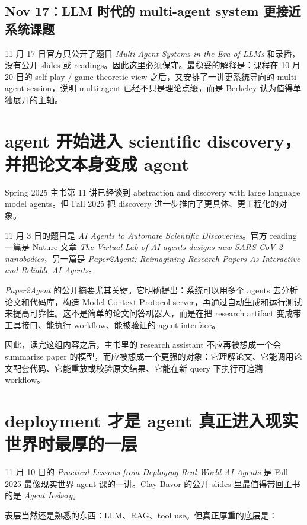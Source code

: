 \subsection{Nov 17：LLM 时代的 multi-agent system 更接近系统课题}

11 月 17 日官方只公开了题目 \emph{Multi-Agent Systems in the Era of LLMs} 和录播，没有公开 slides 或 readings。因此这里必须保守。最稳妥的解释是：课程在 10 月 20 日的 self-play / game-theoretic view 之后，又安排了一讲更系统导向的 multi-agent session，说明 multi-agent 已经不只是理论点缀，而是 Berkeley 认为值得单独展开的主轴。

\section{agent 开始进入 scientific discovery，并把论文本身变成 agent}

Spring 2025 主书第 11 讲已经谈到 abstraction and discovery with large language model agents。但 Fall 2025 把 discovery 进一步推向了更具体、更工程化的对象。

11 月 3 日的题目是 \emph{AI Agents to Automate Scientific Discoveries}。官方 reading 一篇是 Nature 文章 \emph{The Virtual Lab of AI agents designs new SARS-CoV-2 nanobodies}，另一篇是 \emph{Paper2Agent: Reimagining Research Papers As Interactive and Reliable AI Agents}。

\emph{Paper2Agent} 的公开摘要尤其关键。它明确提出：系统可以用多个 agents 去分析论文和代码库，构造 Model Context Protocol server，再通过自动生成和运行测试来提高可靠性。这不是简单的论文问答机器人，而是在把 research artifact 变成带工具接口、能执行 workflow、能被验证的 agent interface。

因此，读完这组内容之后，主书里的 research assistant 不应再被想成一个会 summarize paper 的模型，而应被想成一个更强的对象：它理解论文、它能调用论文配套代码、它能重放或校验原文结果、它能在新 query 下执行可追溯 workflow。

\section{deployment 才是 agent 真正进入现实世界时最厚的一层}

11 月 10 日的 \emph{Practical Lessons from Deploying Real-World AI Agents} 是 Fall 2025 最像现实世界 agent 课的一讲。Clay Bavor 的公开 slides 里最值得带回主书的是 \emph{Agent Iceberg}。

表层当然还是熟悉的东西：LLM、RAG、tool use。但真正厚重的底层是：

